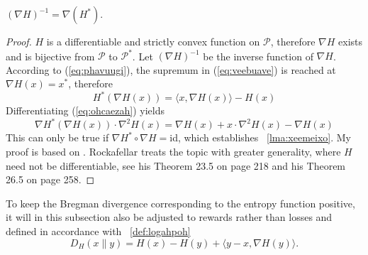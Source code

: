 \documentclass[12pt]{article}
\begin{document}
\begin{lemma}
  \label{lma:xeemeixo}
  $\left(\nabla{}H\right)^{-1}=\nabla\left(H^{\ast}\right)$.
\end{lemma}
\begin{proof}
  \label{prf:ezegheop}
$H$ is a differentiable and strictly convex function on $\mathcal{P}$,
therefore $\nabla{}H$ exists and is bijective from $\mathcal{P}$ to
$\mathcal{P}^{\ast}$. Let $(\nabla{}H)^{-1}$ be the inverse function
of $\nabla{}H$. According to (\ref{eq:phavuugi}), the supremum in
(\ref{eq:veebuave}) is reached at $\nabla{}H(x)=x^{\ast}$, therefore
\begin{equation}
  \label{eq:ohcaezah}
  H^{\ast}(\nabla{}H(x))=\langle{}x,\nabla{}H(x)\rangle-H(x)
\end{equation}
Differentiating (\ref{eq:ohcaezah}) yields
\begin{equation}
  \label{eq:uephaele}
\nabla{}H^{\ast}(\nabla{}H(x))\cdot\nabla^{2}H(x)=\nabla{}H(x)+x\cdot\nabla^{2}H(x)-\nabla{}H(x)
\end{equation}
This can only be true if $\nabla{}H^{\ast}\circ\nabla{}H=$id, which
establishes {\emma}~\ref{lma:xeemeixo}. My proof is based on
. Rockafellar treats the topic with greater
generality, where $H$ need not be differentiable, see his Theorem 23.5
on page 218 and his Theorem 26.5 on page 258.
\end{proof}


To keep the Bregman divergence corresponding to the entropy function
positive, it will in this subsection also be adjusted to rewards
rather than losses and defined in accordance with
{\efinition}~\ref{def:logahpoh}
\begin{equation}
  \label{eq:pooceiyu}
  D_{H}(x\|y)=H(x)-H(y)+\langle{}y-x,\nabla{}H(y)\rangle.
\end{equation}
\end{document}
